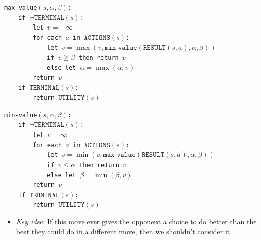 \documentclass[twocolumn,english]{article}
\begin{document}
\texttt{}
\begin{table}[H]
\raggedright{}\texttt{\small{}max-value$\left(s,\alpha,\beta\right)$:}~\\
\texttt{\small{}$\qquad$if $\lnot\texttt{TERMINAL}\left(s\right)$:}~\\
\texttt{\small{}$\qquad\qquad$let $v=-\infty$}~\\
\texttt{\small{}$\qquad\qquad$for each $a$ in $\texttt{ACTIONS}\left(s\right)$:}~\\
\texttt{\small{}$\qquad\qquad\qquad$let $v=\max\left(v,\texttt{min-value}\left(\texttt{RESULT}\left(s,a\right),\alpha,\beta\right)\right)$}~\\
\texttt{\small{}$\qquad\qquad\qquad$if $v\geq\beta$ then return
$v$}~\\
\texttt{\small{}$\qquad\qquad\qquad$else let $\alpha=\max\left(\alpha,v\right)$}~\\
\texttt{\small{}$\qquad\qquad$return $v$}~\\
\texttt{\small{}$\qquad$if $\texttt{TERMINAL}\left(s\right)$:}~\\
\texttt{\small{}$\qquad\qquad$return $\texttt{UTILITY}\left(s\right)$}
\end{table}
\texttt{}
\begin{table}[H]
\raggedright{}\texttt{\small{}min-value$\left(s,\alpha,\beta\right)$:}~\\
\texttt{\small{}$\qquad$if $\lnot\texttt{TERMINAL}\left(s\right)$:}~\\
\texttt{\small{}$\qquad\qquad$let $v=\infty$}~\\
\texttt{\small{}$\qquad\qquad$for each $a$ in $\texttt{ACTIONS}\left(s\right)$:}~\\
\texttt{\small{}$\qquad\qquad\qquad$let $v=\min\left(v,\texttt{max-value}\left(\texttt{RESULT}\left(s,a\right),\alpha,\beta\right)\right)$}~\\
\texttt{\small{}$\qquad\qquad\qquad$if $v\leq\alpha$ then return
$v$}~\\
\texttt{\small{}$\qquad\qquad\qquad$else let $\beta=\min\left(\beta,v\right)$}~\\
\texttt{\small{}$\qquad\qquad$return $v$}~\\
\texttt{\small{}$\qquad$if $\texttt{TERMINAL}\left(s\right)$:}~\\
\texttt{\small{}$\qquad\qquad$return $\texttt{UTILITY}\left(s\right)$}
\end{table}
\begin{itemize}
\item \emph{Key idea}: If this move ever gives the opponent a choice to
do better than the best they could do in a different move, then we
shouldn't consider it.
\end{itemize}
\end{document}

